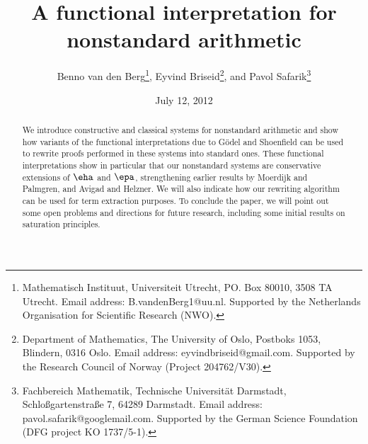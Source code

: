 \documentclass[a4paper,10pt,twoside]{article}
\begin{document}
\title{A functional interpretation for nonstandard arithmetic}
\author{Benno van den Berg\footnote{Mathematisch Instituut, Universiteit Utrecht,
PO. Box 80010, 3508 TA Utrecht. Email address: B.vandenBerg1@uu.nl. Supported by the Netherlands Organisation for Scientific Research (NWO).
}, Eyvind Briseid\footnote{
Department of Mathematics,
The University of Oslo,
Postboks 1053, Blindern,
0316 Oslo. Email address: eyvindbriseid@gmail.com. Supported by the Research Council of Norway (Project 204762/V30).}, and Pavol Safarik\footnote{Fachbereich Mathematik, Technische Universit\"{a}t Darmstadt,
Schlo{\ss}gartenstra{\ss}e 7, 64289 Darmstadt. Email address:  pavol.safarik@googlemail.com. Supported by the German Science Foundation (DFG project KO 1737/5-1).}}
\date{July 12, 2012}
\maketitle

\begin{abstract}
\noindent
We introduce constructive and classical systems for nonstandard arithmetic and show how variants of the functional interpretations due to G\"odel and Shoenfield can be used to rewrite proofs performed in these systems into standard ones. These functional interpretations show in particular that our nonstandard systems are conservative extensions of $\eha$ and $\epa$, strengthening earlier results by Moer\-dijk and Palmgren, and Avigad and Helzner. We will also indicate how our rewriting algorithm can be used for term extraction purposes. To conclude the paper, we will point out some open problems and directions for future research, including some initial results on saturation principles.
\end{abstract}

\tableofcontents



%





%


 
\end{document}
